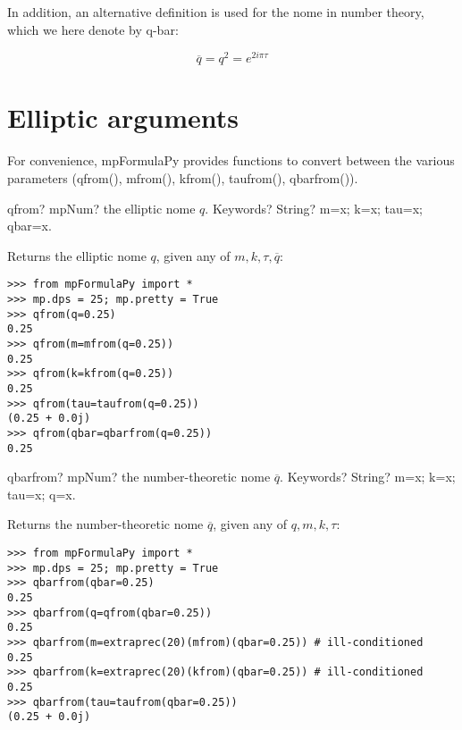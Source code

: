 In addition, an alternative definition is used for the nome in number theory, which we here denote by q-bar:

\begin{equation}
\overline{q} = q^2 = e^{2 i \pi \tau}
\end{equation}

\section{Elliptic arguments}

For convenience, mpFormulaPy provides functions to convert between the various parameters (qfrom(), mfrom(), kfrom(), taufrom(), qbarfrom()).


\vspace{0.6cm}

\begin{mpFunctionsExtract}
	\mpFunctionOne
	{qfrom? mpNum? the elliptic nome $q$.}
	{Keywords? String? m=x; k=x; tau=x; qbar=x.}
\end{mpFunctionsExtract}

\vpara
Returns the elliptic nome $q$, given any of $m, k, \tau, \overline{q}$:

\begin{lstlisting}
>>> from mpFormulaPy import *
>>> mp.dps = 25; mp.pretty = True
>>> qfrom(q=0.25)
0.25
>>> qfrom(m=mfrom(q=0.25))
0.25
>>> qfrom(k=kfrom(q=0.25))
0.25
>>> qfrom(tau=taufrom(q=0.25))
(0.25 + 0.0j)
>>> qfrom(qbar=qbarfrom(q=0.25))
0.25
\end{lstlisting}


\vspace{0.6cm}

\begin{mpFunctionsExtract}
	\mpFunctionOne
	{qbarfrom? mpNum? the number-theoretic nome $\overline{q}$.}
	{Keywords? String? m=x; k=x; tau=x; q=x.}
\end{mpFunctionsExtract}

\vpara
Returns the number-theoretic nome $\overline{q}$, given any of $q, m, k, \tau$:

\begin{lstlisting}
>>> from mpFormulaPy import *
>>> mp.dps = 25; mp.pretty = True
>>> qbarfrom(qbar=0.25)
0.25
>>> qbarfrom(q=qfrom(qbar=0.25))
0.25
>>> qbarfrom(m=extraprec(20)(mfrom)(qbar=0.25)) # ill-conditioned
0.25
>>> qbarfrom(k=extraprec(20)(kfrom)(qbar=0.25)) # ill-conditioned
0.25
>>> qbarfrom(tau=taufrom(qbar=0.25))
(0.25 + 0.0j)
\end{lstlisting}



